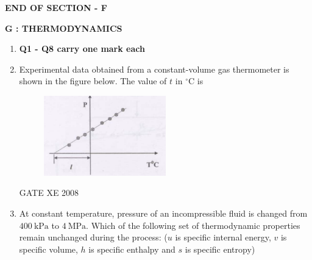 \documentclass[12pt]{article}
\begin{document}
\begin{center}
    \textbf{END OF SECTION - F}
\end{center}

\newpage

\begin{center}
    \textbf{\Large G : THERMODYNAMICS}
\end{center}

\begin{enumerate}
\item[] \textbf{Q1 - Q8 carry one mark each}

\item Experimental data obtained from a constant-volume gas thermometer is shown in the figure below. The value of $t$ in $^\circ$C is  

    \begin{figure}[H]
    \centering
    \includegraphics[width=0.5\textwidth]{figs/ass1_g_q1.png}
    \caption{}
    \end{figure}
\begin{enumerate}
\end{enumerate}

GATE XE 2008

\item At constant temperature, pressure of an incompressible fluid is changed from $400\ \mathrm{kPa}$ to $4\ \mathrm{MPa}$. Which of the following set of thermodynamic properties remain unchanged during the process: ($u$ is specific internal energy, $v$ is specific volume, $h$ is specific enthalpy and $s$ is specific entropy)  

\begin{enumerate}
\end{enumerate}


\end{enumerate}
\end{document}
